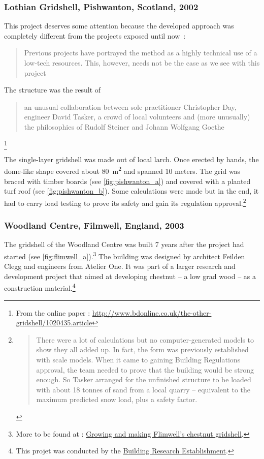 \subsubsection{Lothian Gridshell, Pishwanton, Scotland, 2002}
This project deserves some attention because the developed approach was completely different from the projects exposed until now~: \blockcquote[]{Lowenstein2002}{Previous projects have portrayed the method as a highly technical use of a low-tech resources. This, however, needs not be the case as we see with this project \belp{}}. The structure was the result of \blockcquote[]{bdonline2002}{\belp{} an unusual collaboration between sole practitioner Christopher Day, engineer David Tasker, a crowd of local volunteers and (more unusually) the philosophies of Rudolf Steiner and Johann Wolfgang Goethe}.\footnote{From the online paper  : \url{http://www.bdonline.co.uk/the-other-gridshell/1020435.article}}

The single-layer gridshell was made out of local larch. Once erected by hands, the dome-like shape covered about \SI{80}{m^2} and spanned 10 meters. The grid was braced with timber boards (see \cref{fig:pishwanton_a}) and covered with a planted turf roof (see \cref{fig:pishwanton_b}). Some calculations were made but in the end, it had to carry load testing to prove its safety and gain its regulation approval.\footnote{\blockcquote[]{bdonline2002}{There were a lot of calculations but no computer-generated models to show they all added up. In fact, the form was previously established with scale models. When it came to gaining Building Regulations approval, the team needed to prove that the building would be strong enough. So Tasker arranged for the unfinished structure to be loaded with about 18 tonnes of sand from a local quarry – equivalent to the maximum predicted snow load, plus a safety factor.}}

\subsubsection{Woodland Centre, Filmwell, England, 2003}
The gridshell of the Woodland Centre was built 7 years after the project had started (see \cref{fig:flimwell_a}).\footnote{More to be found at : \href{http://www.fourthdoor.org/annular/?page_id=441}{Growing and making Flimwell’s chestnut gridshell}.} The building was designed by architect Feilden Clegg and engineers from Atelier One. It was part of a larger research and development project that aimed at developing chestnut -- a low grad wood -- as a construction material.\footnote{This projet was conducted by the \href{http://www.bre.co.uk/}{Building Research Establishment}.}

